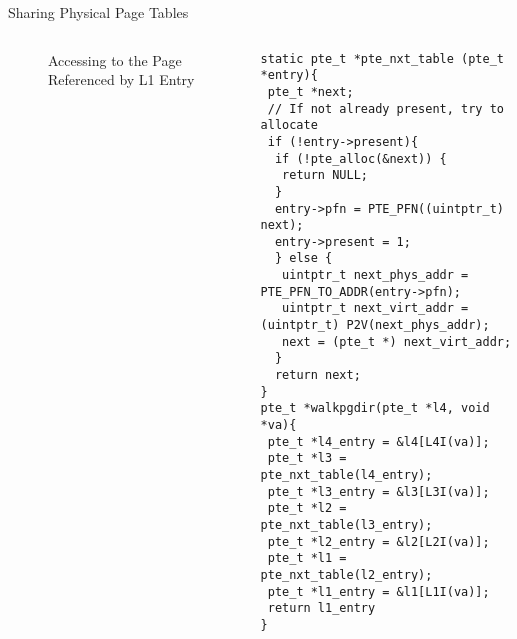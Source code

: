 \documentclass[aspectratio=169,xcolor=dvipsnames]{beamer}
\begin{document}
\begin{frame}[fragile]{Sharing Physical Page Tables}
\begin{columns}[c]
\begin{figure}
\begin{tikzpicture}[x=0.75pt,y=0.75pt,yscale=-0.5,xscale=0.5]
\end{tikzpicture}
          \caption{Accessing to the Page Referenced by L1 Entry}
        \label{fig:enter-label}
    \end{figure}
\begin{lstlisting}[style=CStyleNum, basicstyle=\tiny]
static pte_t *pte_nxt_table (pte_t *entry){
 pte_t *next;
 // If not already present, try to allocate
 if (!entry->present){
  if (!pte_alloc(&next)) {
   return NULL;
  }
  entry->pfn = PTE_PFN((uintptr_t) next);
  entry->present = 1;
  } else {
   uintptr_t next_phys_addr = PTE_PFN_TO_ADDR(entry->pfn);        
   uintptr_t next_virt_addr = (uintptr_t) P2V(next_phys_addr);
   next = (pte_t *) next_virt_addr;
  }
  return next;
}   
pte_t *walkpgdir(pte_t *l4, void *va){ 
 pte_t *l4_entry = &l4[L4I(va)];
 pte_t *l3 = pte_nxt_table(l4_entry);
 pte_t *l3_entry = &l3[L3I(va)];
 pte_t *l2 = pte_nxt_table(l3_entry);
 pte_t *l2_entry = &l2[L2I(va)];  
 pte_t *l1 = pte_nxt_table(l2_entry);
 pte_t *l1_entry = &l1[L1I(va)];  
 return l1_entry
}
\end{lstlisting}
\end{columns}
\end{frame}
\end{document}
